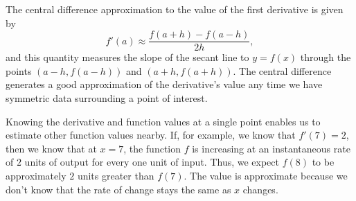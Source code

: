 \begin{summary}

\item The central difference approximation to the value of the first derivative is given by 
$$f'(a) \approx \frac{f(a+h) - f(a-h)}{2h},$$
and this quantity measures the slope of the secant line to $y = f(x)$ through the points $(a-h, f(a-h))$ and $(a+h, f(a+h))$.  The central difference generates a good approximation of the derivative's value any time we have symmetric data surrounding a point of interest.

\item Knowing the derivative and function values at a single point enables us to estimate other function values nearby.  If, for example, we know that $f'(7) = 2$, then we know that at $x = 7$, the function $f$ is increasing at an instantaneous rate of $2$ units of output for every one unit of input.  Thus, we expect $f(8)$ to be approximately $2$ units greater than $f(7)$.  The value is approximate because we don't know that the rate of change stays the same as $x$ changes.
\end{summary}

\clearpage

 

\cleardoublepage